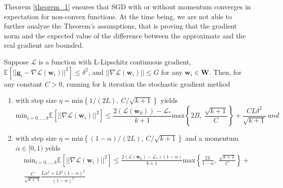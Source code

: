 			Theorem \ref{theorem_1} ensures that SGD with or without momentum converges in expectation for non-convex functions. At the time being, we are not able to further analyze the Theorem’s assumptions, that is proving that the gradient norm and the expected value of the difference between the approximate and the real gradient are bounded.

			\begin{theorem}
				Suppose $\mathcal{L}$ is a function with L-Lipschitz continuous gradient,
				$\mathbb{E} \left [ || \mathbf{g}_{i} - \nabla \mathcal{L}(\textbf{w}_{i}) ||^2 \right ] \le \delta^2$, and
				$|| \nabla \mathcal{L}(\textbf{w}_{i}) || \le G$ for any $\textbf{w}_{i} \in \textbf{W}$. Then, for any constant
				$C > 0$, running for k iteration the stochastic gradient method

				\begin{enumerate}
					\item with step size $\eta = \text{min} \left \{ 1\slash(2L),\ C\slash\sqrt{k + 1} \right \}$
					yields
					\begin{equation*}
					    \text{min}_{i = 0, \ldots, k} \mathbb{E} \left [ || \nabla \mathcal{L}(\textbf{w}_i) ||^2 \right ]
					    \le \frac{2(\mathcal{L}(\textbf{w}_{0})) - \mathcal{L}_{*}}{k + 1} \text{max} \left\{ 2B,\
					    \frac{\sqrt{k + 1}}{C} \right\} + \frac{CL\delta^2}{\sqrt{k + 1}} \ and
					\end{equation*}
					\item with step size $\eta = \text{min} \left \{ (1 - \alpha)\slash(2L),\
					C\slash\sqrt{k + 1} \right \}$ and a momentum $\alpha \in [0, 1)$ yelds
					\begin{align*}
						&\text{min}_{i = 0, \ldots, k} \mathbb{E} \left [ || \nabla \mathcal{L}(\textbf{w}_{i}) ||^2 \right ]
						\le \frac{2(\mathcal{L}(\textbf{w}_{0}) - \mathcal{L}_{*})(1 - \alpha)}{k + 1}
						\text{max} \left\{ \frac{2L}{1 - \alpha},\ \frac{\sqrt{k + 1}}{C} \right\} + \\
						&\frac{C}{\sqrt{k + 1}}\frac{L\alpha^2 + L\delta^2(1 - \alpha)^2}{(1 - \alpha)^3}
					\end{align*}
				\end{enumerate}
				\label{theorem_1}
			\end{theorem}


